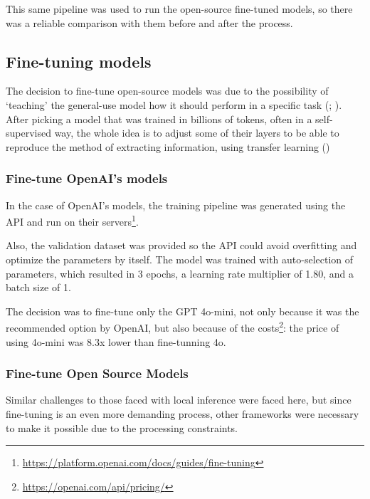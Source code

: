 \documentclass[
  12pt,
]{article}
\begin{document}
This same pipeline was used to run the open-source fine-tuned models, so
there was a reliable comparison with them before and after the process.

\subsection{Fine-tuning models}\label{fine-tuning-models}

The decision to fine-tune open-source models was due to the possibility
of `teaching' the general-use model how it should perform in a specific
task (; ). After
picking a model that was trained in billions of tokens, often in a
self-supervised way, the whole idea is to adjust some of their layers to
be able to reproduce the method of extracting information, using
transfer learning ()

\subsubsection{Fine-tune OpenAI's
models}\label{fine-tune-openais-models}

In the case of OpenAI's models, the training pipeline was generated
using the API and run on their servers\footnote{\url{https://platform.openai.com/docs/guides/fine-tuning}}.

Also, the validation dataset was provided so the API could avoid
overfitting and optimize the parameters by itself. The model was trained
with auto-selection of parameters, which resulted in 3 epochs, a
learning rate multiplier of 1.80, and a batch size of 1.

The decision was to fine-tune only the GPT 4o-mini, not only because it
was the recommended option by OpenAI, but also because of the
costs\footnote{\url{https://openai.com/api/pricing/}}: the price of
using 4o-mini was 8.3x lower than fine-tunning 4o.

\subsubsection{Fine-tune Open Source
Models}\label{fine-tune-open-source-models}

Similar challenges to those faced with local inference were faced here,
but since fine-tuning is an even more demanding process, other
frameworks were necessary to make it possible due to the processing
constraints.
\end{document}
